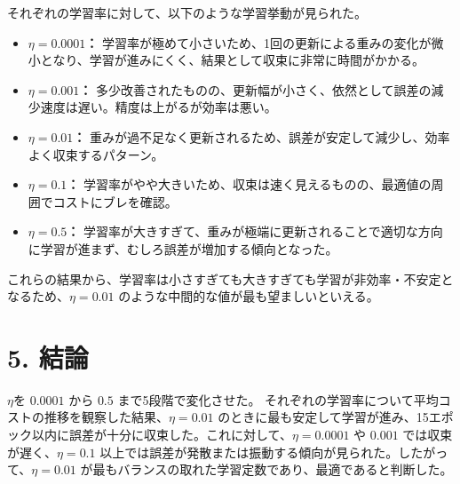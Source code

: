\documentclass[a4paper,11pt,titlepage]{jsarticle}
\begin{document}
それぞれの学習率に対して、以下のような学習挙動が見られた。

\begin{itemize}
    \item \textbf{$\eta = 0.0001$：} 学習率が極めて小さいため、1回の更新による重みの変化が微小となり、学習が進みにくく、結果として収束に非常に時間がかかる。
    
    \item \textbf{$\eta = 0.001$：} 多少改善されたものの、更新幅が小さく、依然として誤差の減少速度は遅い。精度は上がるが効率は悪い。
    
    \item \textbf{$\eta = 0.01$：} 重みが過不足なく更新されるため、誤差が安定して減少し、効率よく収束するパターン。
    
    \item \textbf{$\eta = 0.1$：} 学習率がやや大きいため、収束は速く見えるものの、最適値の周囲でコストにブレを確認。
        
    \item \textbf{$\eta = 0.5$：} 学習率が大きすぎて、重みが極端に更新されることで適切な方向に学習が進まず、むしろ誤差が増加する傾向となった。
\end{itemize}

これらの結果から、学習率は小さすぎても大きすぎても学習が非効率・不安定となるため、$\eta = 0.01$ のような中間的な値が最も望ましいといえる。


\section*{5. 結論}
$\eta$を $0.0001$ から $0.5$ まで5段階で変化させた。
それぞれの学習率について平均コストの推移を観察した結果、$\eta = 0.01$ のときに最も安定して学習が進み、15エポック以内に誤差が十分に収束した。これに対して、$\eta = 0.0001$ や $0.001$ では収束が遅く、$\eta = 0.1$ 以上では誤差が発散または振動する傾向が見られた。したがって、$\eta = 0.01$ が最もバランスの取れた学習定数であり、最適であると判断した。
\end{document}
